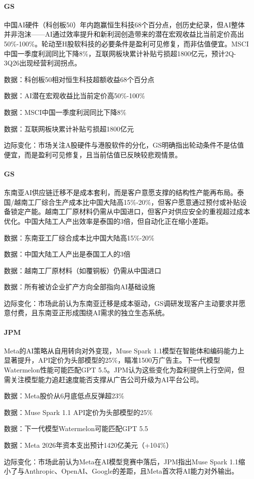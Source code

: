 \documentclass[11pt]{ctexart}
\begin{document}
\paragraph{GS} 中国AI硬件（科创板50）年内跑赢恒生科技68个百分点，创历史纪录，但AI整体并非泡沫——AI通过效率提升和新利润创造带来的潜在宏观收益比当前定价高出50\%-100\%。轮动至H股软科技的必要条件是盈利可见修复，而非估值便宜。MSCI中国一季度利润同比下降8\%，互联网板块累计补贴亏损超1800亿元，预计2Q-3Q26出现经营利润拐点。
{\small\color{refgray}数据：科创板50相对恒生科技超额收益68个百分点\par}
{\small\color{refgray}数据：AI潜在宏观收益比当前定价高50\%-100\%\par}
{\small\color{refgray}数据：MSCI中国一季度利润同比下降8\%\par}
{\small\color{refgray}数据：互联网板块累计补贴亏损超1800亿元\par}
{\small\color{refgray}边际变化：市场关注A股硬件与港股软件的分化，GS明确指出轮动条件不是估值便宜，而是盈利可见修复，且当前估值已反映较悲观情景。\par}
\paragraph{GS} 东南亚AI供应链迁移不是成本套利，而是客户意愿支撑的结构性产能再布局。泰国/越南工厂综合生产成本比中国大陆高15\%-20\%，但客户愿意通过预付或补贴设备锁定产能。越南工厂原材料仍需从中国进口，但客户对供应安全的重视超过成本优化。中国大陆工人产出效率是泰国的3倍，但自动化正在缩小差距。
{\small\color{refgray}数据：东南亚工厂综合成本比中国大陆高15\%-20\%\par}
{\small\color{refgray}数据：中国大陆工人产出是泰国工人的3倍\par}
{\small\color{refgray}数据：越南工厂原材料（如覆铜板）仍需从中国进口\par}
{\small\color{refgray}数据：所有被访企业扩产方向全部指向AI基础设施\par}
{\small\color{refgray}边际变化：市场此前认为东南亚迁移是成本驱动，GS调研发现客户主动要求并愿意付费，且东南亚正形成围绕AI需求的独立生态系统。\par}
\paragraph{JPM} Meta的AI策略从自用转向对外变现，Muse Spark 1.1模型在智能体和编码能力上显著提升，API定价为头部模型的25\%，瞄准1500万广告主。下一代模型Watermelon性能可能匹配GPT 5.5。JPM认为这些变化为盈利提供上行空间，但需关注模型能力追赶速度能否支撑从广告公司升级为AI平台公司。
{\small\color{refgray}数据：Meta股价从6月底低点反弹超23\%\par}
{\small\color{refgray}数据：Muse Spark 1.1 API定价为头部模型的25\%\par}
{\small\color{refgray}数据：下一代模型Watermelon可能匹配GPT 5.5\par}
{\small\color{refgray}数据：Meta 2026年资本支出预计1420亿美元（+104\%）\par}
{\small\color{refgray}边际变化：市场此前认为Meta在AI模型竞赛中落后，JPM指出Muse Spark 1.1缩小了与Anthropic、OpenAI、Google的差距，且Meta首次将AI能力对外输出。\par}
\end{document}
